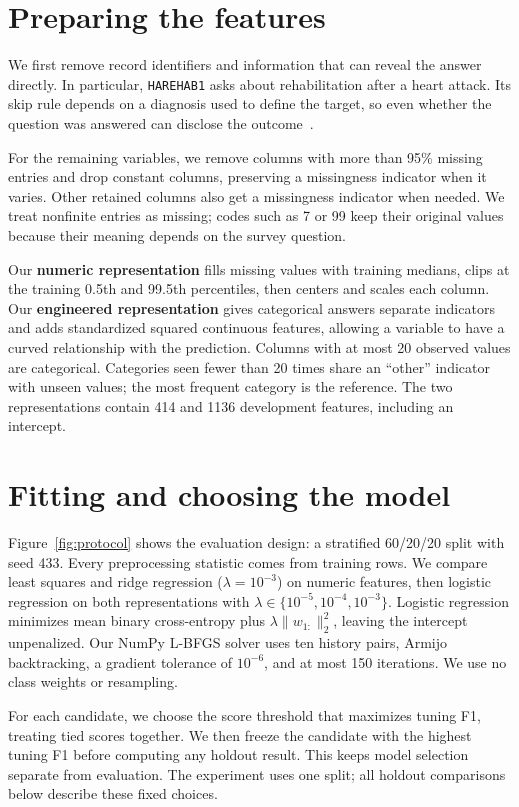 \documentclass[10pt,a4paper]{article}
\begin{document}
\section{Preparing the features}
We first remove record identifiers and information that can reveal the answer directly. In particular, \texttt{HAREHAB1} asks about rehabilitation after a heart attack. Its skip rule depends on a diagnosis used to define the target, so even whether the question was answered can disclose the outcome~\cite{cdc}.

For the remaining variables, we remove columns with more than 95\% missing entries and drop constant columns, preserving a missingness indicator when it varies. Other retained columns also get a missingness indicator when needed. We treat nonfinite entries as missing; codes such as 7 or 99 keep their original values because their meaning depends on the survey question.

Our \textbf{numeric representation} fills missing values with training medians, clips at the training 0.5th and 99.5th percentiles, then centers and scales each column. Our \textbf{engineered representation} gives categorical answers separate indicators and adds standardized squared continuous features, allowing a variable to have a curved relationship with the prediction. Columns with at most 20 observed values are categorical. Categories seen fewer than 20 times share an ``other'' indicator with unseen values; the most frequent category is the reference. The two representations contain 414 and 1136 development features, including an intercept.

\section{Fitting and choosing the model}
Figure~\ref{fig:protocol} shows the evaluation design: a stratified 60/20/20 split with seed 433. Every preprocessing statistic comes from training rows. We compare least squares and ridge regression ($\lambda=10^{-3}$) on numeric features, then logistic regression on both representations with $\lambda\in\{10^{-5},10^{-4},10^{-3}\}$. Logistic regression minimizes mean binary cross-entropy plus $\lambda\|w_{1:}\|_2^2$, leaving the intercept unpenalized. Our NumPy L-BFGS solver uses ten history pairs, Armijo backtracking, a gradient tolerance of $10^{-6}$, and at most 150 iterations. We use no class weights or resampling.

For each candidate, we choose the score threshold that maximizes tuning F1, treating tied scores together. We then freeze the candidate with the highest tuning F1 before computing any holdout result. This keeps model selection separate from evaluation. The experiment uses one split; all holdout comparisons below describe these fixed choices.
\end{document}
